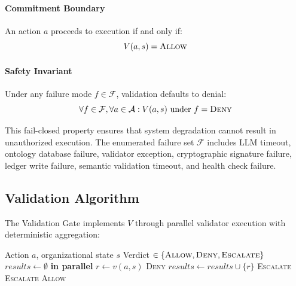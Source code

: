 \documentclass[sigconf,nonacm]{acmart}
\begin{document}
\paragraph{Commitment Boundary} An action $a$ proceeds to execution if and only if:
\begin{equation}
V(a, s) = \textsc{Allow}
\end{equation}

\paragraph{Safety Invariant} Under any failure mode $f \in \mathcal{F}$, validation defaults to denial:
\begin{equation}
\forall f \in \mathcal{F}, \forall a \in \mathcal{A}: V(a, s) \text{ under } f = \textsc{Deny}
\end{equation}

This fail-closed property ensures that system degradation cannot result in unauthorized execution. The enumerated failure set $\mathcal{F}$ includes LLM timeout, ontology database failure, validator exception, cryptographic signature failure, ledger write failure, semantic validation timeout, and health check failure.

\subsection{Validation Algorithm}

The Validation Gate implements $V$ through parallel validator execution with deterministic aggregation:

\begin{algorithm}[htbp]
\caption{Deterministic Validation Gate}
\label{alg:validation}
\begin{algorithmic}[1]
\Require Action $a$, organizational state $s$
\Ensure Verdict $\in \{\textsc{Allow}, \textsc{Deny}, \textsc{Escalate}\}$
\State $\textit{results} \gets \emptyset$
 \textbf{in parallel}
    \State $r \gets v(a, s)$
        \State \Return \textsc{Deny} 
    \EndIf
    \State $\textit{results} \gets \textit{results} \cup \{r\}$
\EndFor
{}
    \State \Return \textsc{Escalate}
    \State \Return \textsc{Escalate} 
\Else
    \State \Return \textsc{Allow}
\EndIf
\end{algorithmic}
\end{algorithm}
\end{document}
